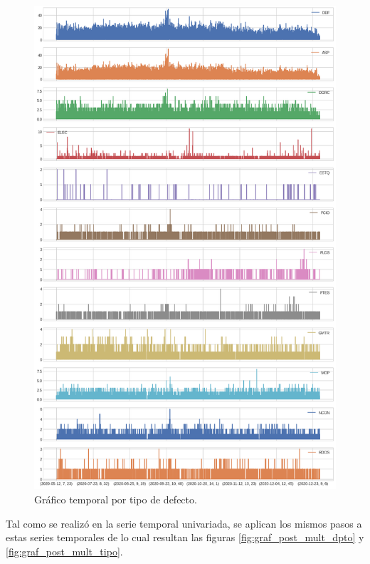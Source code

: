 \documentclass[a4paper,12pt]{article}
\begin{document}
\begin{figure}[H]
	\begin{center}
	\includegraphics[width=1\textwidth]{multi_flia.png}
  	\caption{Gráfico temporal por tipo de defecto.}
  	\label{fig:graf_mult_tipo}
  	\end{center}
\end{figure}

Tal como se realizó en la serie temporal univariada, se aplican los mismos pasos a estas series temporales de lo cual resultan las figuras \ref{fig:graf_post_mult_dpto} y \ref{fig:graf_post_mult_tipo}.
\end{document}
